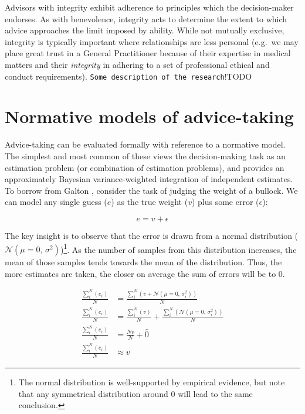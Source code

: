 \documentclass[a4paper, nobind]{templates/ociamthesis}
\begin{document}
Advisors with integrity exhibit adherence to principles which the decision-maker endorses. As with benevolence, integrity acts to determine the extent to which advice approaches the limit imposed by ability. While not mutually exclusive, integrity is typically important where relationships are less personal (e.g.~we may place great trust in a General Practitioner because of their expertise in medical matters and their \emph{integrity} in adhering to a set of professional ethical and conduct requirements). \texttt{Some\ description\ of\ the\ research}\autocite{CITATIONNEEDED}!TODO

\hypertarget{normative-models-of-advice-taking}{%
\section*{Normative models of advice-taking}\label{normative-models-of-advice-taking}}

Advice-taking can be evaluated formally with reference to a normative model. The simplest and most common of these views the decision-making task as an estimation problem (or combination of estimation problems), and provides an approximately Bayesian variance-weighted integration of independent estimates. To borrow from Galton \autocite*{galtonVoxPopuliWisdom1907}, consider the task of judging the weight of a bullock. We can model any single guess (\(e\)) as the true weight (\(v\)) plus some error (\(\epsilon\)):

\begin{equation}
e = v + \epsilon
\label{eq:estimate}
\end{equation}

The key insight is to observe that the error is drawn from a normal distribution (\(\mathcal{N}(\mu=0,\,\sigma^{2})\))\footnote{The normal distribution is well-supported by empirical evidence, but note that any symmetrical distribution around 0 will lead to the same conclusion.}. As the number of samples from this distribution increases, the mean of those samples tends towards the mean of the distribution. Thus, the more estimates are taken, the closer on average the sum of errors will be to 0.

\begin{align}
\frac{\sum_{i}^{N}(e_{i})}{N} &= \frac{\sum_{i}^{N}(v + \mathcal{N}(\mu=0,\,\sigma^{2}_{i}))}{N}\\
\frac{\sum_{i}^{N}(e_{i})}{N} &= \frac{\sum_{i}^{N}(v)}{N} + \frac{\sum_{i}^{N}(\mathcal{N}(\mu=0,\,\sigma^{2}_{i}))}{N}\\
\frac{\sum_{i}^{N}(e_{i})}{N} &= \frac{Nv}{N} + \hat{0}\\
\frac{\sum_{i}^{N}(e_{i})}{N} &\approx v
\label{eq:wisdom-of-crowds}
\end{align}
\end{document}
